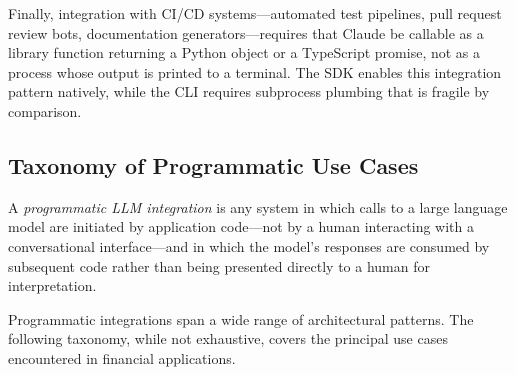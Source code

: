 Finally, integration with CI/CD systems---automated test pipelines, pull request review
bots, documentation generators---requires that Claude be callable as a library function
returning a Python object or a TypeScript promise, not as a process whose output is
printed to a terminal. The SDK enables this integration pattern natively, while the CLI
requires subprocess plumbing that is fragile by comparison.

\subsection{Taxonomy of Programmatic Use Cases}
\label{app:sdk-commercial:motivation:taxonomy}

\begin{definition}
\label{def:programmatic-llm}
A \emph{programmatic LLM integration} is any system in which calls to a large language
model are initiated by application code---not by a human interacting with a
conversational interface---and in which the model's responses are consumed by subsequent
code rather than being presented directly to a human for interpretation.
\end{definition}

Programmatic integrations span a wide range of architectural patterns. The following
taxonomy, while not exhaustive, covers the principal use cases encountered in financial
applications.

